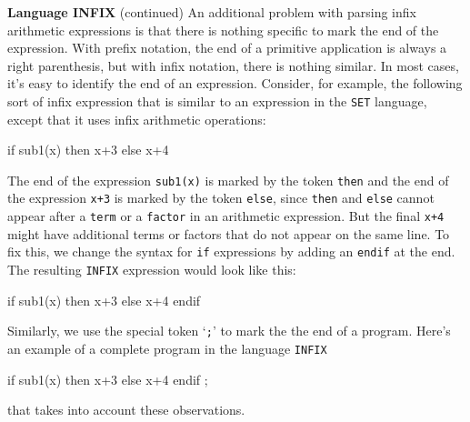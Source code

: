 \begin{minipage}[t]{\sw}
\slidenumber
\LARGE
{\bf Language INFIX} (continued)\exx
An additional problem with parsing infix arithmetic expressions
is that there is nothing specific to mark the end of the expression.
With prefix notation, the end of a primitive application is always
a right parenthesis,
but with infix notation, there is nothing similar.
In most cases, it's easy to identify the end of an expression.
Consider, for example, the following sort of infix expression
that is similar to an expression in the \verb'SET' language,
except that it uses infix arithmetic operations:
\begin{qv}
if sub1(x) then x+3 else x+4
\end{qv}
The end of the expression \verb'sub1(x)'
is marked by the token \verb'then'
and the end of the expression \verb'x+3'
is marked by the token  \verb'else',
since \verb'then' and \verb'else' cannot appear
after a \verb'term' or a \verb'factor' in an arithmetic expression.
But the final \verb'x+4' might have additional terms or factors
that do not appear on the same line.
To fix this, we change the syntax for \verb'if' expressions
by adding an \verb'endif' at the end.
The resulting \verb'INFIX' expression would look like this:
\begin{qv}
if sub1(x) then x+3 else x+4 endif
\end{qv}
Similarly, we use the special token `\verb';''
to mark the the end of a program.
Here's an example of a complete program in the language \verb'INFIX'
\begin{qv}
if sub1(x) then x+3 else x+4 endif ;
\end{qv}
that takes into account these observations.
\end{minipage}

